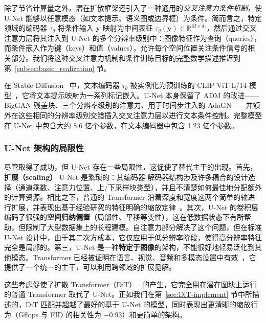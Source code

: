 \documentclass[../../book-main_zh.tex]{subfiles}
\begin{document}
除了节省计算量之外，潜在扩散框架还引入了一种通用的\emph{交叉注意力条件机制}，使 U-Net 能够以任意模态（如文本提示、语义图或边界框）为条件。简而言之，特定领域的编码器 $\tau_\theta$ 将条件输入 $\boldsymbol{y}$ 映射为中间表征 $\tau_\theta(\boldsymbol{y}) \in \mathbb{R}^{M \times d_\tau}$，然后通过交叉注意力层将其注入到 U-Net 的多个分辨率级别中：图像特征作为查询（queries），而条件嵌入作为键（keys）和值（values），允许每个空间位置关注条件信号的相关部分。我们将这种交叉注意力机制和条件训练目标的完整数学描述推迟到第~\ref{subsec:basic_realization} 节。

在 Stable Diffusion~\citep{rombach2022high} 中，文本编码器 $\tau_\theta$ 被实例化为预训练的 CLIP ViT-L/14 模型~\citep{radford2021learning}，它将文本提示映射为一系列标记嵌入。U-Net 本身保留了 ADM 的改进——BigGAN 残差块、三个分辨率级别的注意力、用于时间步注入的 AdaGN——并额外在这些相同的分辨率级别交错插入交叉注意力层以进行文本条件控制。完整模型在 U-Net 中包含大约 8.6 亿个参数，在文本编码器中包含 1.23 亿个参数。

\subsubsection{U-Net 架构的局限性}
\label{sec:unet-limitations}

尽管取得了成功，但 U-Net 存在一些局限性，这促使了替代主干的出现。首先，\textbf{扩展（scaling）} U-Net 是繁琐的：其编码器-解码器结构涉及许多耦合的设计选择（通道乘数、注意力位置、上/下采样块类型），并且不清楚如何最佳地分配额外的计算资源。相比之下，普通的 Transformer 沿着深度和宽度这两个简单的轴进行扩展，并表现出基于经验研究的特征明确的缩放定律~\citep{kaplan2020scaling}。其次，U-Net 的卷积层编码了很强的\textbf{空间归纳偏置}（局部性、平移等变性），这在低数据状态下有所帮助，但限制了大型数据集上的长程建模。自注意力部分解决了这个问题，但在标准 U-Net 设计中，由于其二次方成本，它仅应用于低分辨率阶段，使得高分辨率特征完全是局部的。第三，U-Net 是一种\textbf{特定于图像}的架构，不能很好地轻易泛化到其他模态。Transformer 已经被证明在语言、视觉、音频和多模态设置中有效~\citep{vaswani2017attention}，它提供了一个统一的主干，可以利用跨领域的扩展见解。

这些考虑促使了扩散 Transformer（DiT）~\citep{peebles2023scalable} 的产生，它完全用在潜在图块上运行的普通 Transformer 取代了 U-Net。正如我们在第~\ref{sec:DiT-implement} 节中所描述的，DiT 匹配并超越了最好的基于 U-Net 的模型，同时表现出更清晰的缩放行为（Gflops 与 FID 的相关性为 $-0.93$）和更简单的架构。
\end{document}

